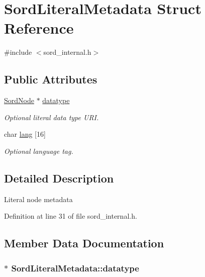 \hypertarget{struct_sord_literal_metadata}{}\section{Sord\+Literal\+Metadata Struct Reference}
\label{struct_sord_literal_metadata}


{\ttfamily \#include $<$sord\+\_\+internal.\+h$>$}

\subsection*{Public Attributes}
\begin{DoxyCompactItemize}
\item 
\hyperlink{group__sord_ga804ac7d56d9fdea50f2d1e7278b1f82b}{Sord\+Node} $\ast$ \hyperlink{struct_sord_literal_metadata_a2c889b0ab837abfde6b82519d1cb04ab}{datatype}
\begin{DoxyCompactList}\small\item\em Optional literal data type U\+RI. \end{DoxyCompactList}\item 
char \hyperlink{struct_sord_literal_metadata_afb8e5cb000235b9949d174f438bab4da}{lang} \mbox{[}16\mbox{]}
\begin{DoxyCompactList}\small\item\em Optional language tag. \end{DoxyCompactList}\end{DoxyCompactItemize}


\subsection{Detailed Description}
Literal node metadata 

Definition at line 31 of file sord\+\_\+internal.\+h.



\subsection{Member Data Documentation}
\subsubsection[{\texorpdfstring{datatype}{datatype}}]{$\ast$ Sord\+Literal\+Metadata\+::datatype}\hypertarget{struct_sord_literal_metadata_a2c889b0ab837abfde6b82519d1cb04ab}{}\label{struct_sord_literal_metadata_a2c889b0ab837abfde6b82519d1cb04ab}



